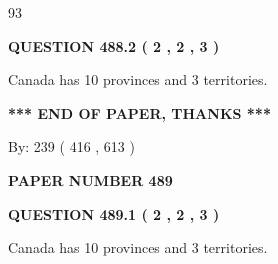 \documentclass[12pt]{article}
\begin{document}
  
 
 
\noindent{}

93
 
 
  
\vspace{0.2in}
  
{\textbf{\Large{QUESTION
488.2 
 ( 2 , 2 , 3 )
}}}
  
  
 
 
\noindent{}
 
 
Canada has 10  provinces and 3 territories.
 
 
 
 
   
   
 \vspace{0.2in}
 
   
   
   
   
\vspace{1.0in} 
{\textbf{\large{ *** END OF PAPER, THANKS *** }}} 
   
   
\hspace{1.0in} By: 
 239 ( 416 ,  613 )
   
   
   
   
\newpage 
\setcounter{page}{ 
   489001 } 
   
   
   
   
 {\textbf{ \Large{ PAPER NUMBER  489  }}}
   
   
\vspace{0.2in}
   
   
   
   
   
   
 \vspace{0.2in}
 
 
 
 
   
   
  
\vspace{0.2in}
  
{\textbf{\Large{QUESTION
489.1 
 ( 2 , 2 , 3 )
}}}
  
  
 
 
\noindent{}
 
 
Canada has 10  provinces and 3 territories.
 
\end{document}
